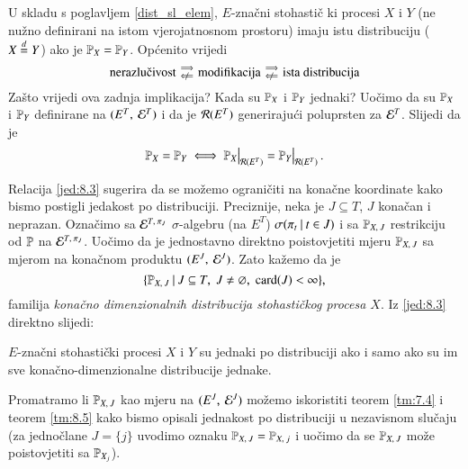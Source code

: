 U skladu s poglavljem \ref{dist_sl_elem}, $E$-zna\v cni stohasti\v c ki procesi $X$ i $Y$ (ne nu\v zno definirani na istom vjerojatnosnom prostoru) imaju istu distribuciju ($X \overset{d}{=} Y$) ako je $\mathbb{P}_X = \mathbb{P}_Y$.
Op\' cenito vrijedi
\begin{equation*}
    \textnormal{nerazlu\v civost}
    \begin{smallmatrix}
        \implies\\
        \notimpliedby
    \end{smallmatrix}
    \textnormal{modifikacija}
    \begin{smallmatrix}
        \implies\\
        \notimpliedby
    \end{smallmatrix}
    \textnormal{ista distribucija}
\end{equation*}
Za\v sto vrijedi ova zadnja implikacija?
Kada su $\mathbb{P}_X$ i $\mathbb{P}_Y$ jednaki?
Uo\v cimo da su $\mathbb{P}_X$ i $\mathbb{P}_Y$ definirane na $({E^T}, \: {\mathcal{E}^T})$ i da je $\mathcal{R}({E^T})$ generiraju\' ci poluprsten za $\mathcal{E}^T$.
Slijedi da je
\begin{equation}    \label{jed:8.3}
    \masP_X = \masP_Y
    \iff
    \restr{\masP_X}{\prsten{E^T}} = \restr{\masP_Y}{\prsten{E^T}}.
\end{equation}

Relacija \ref{jed:8.3} sugerira da se mo\v zemo ograni\v citi na kona\v cne koordinate kako bismo postigli jedakost po distribuciji.
Preciznije, neka je $J \subseteq T$, $J$ kona\v can i neprazan.
Ozna\v cimo sa $\mathcal{E}^{T, \: \pi_J}$ $\sigma$-algebru (na $E^T$) $\sigma({\pi_t} \: | \: {t \in J})$ i sa $\mathbb{P}_{X, \: J}$ restrikciju od $\mathbb{P}$ na $\mathcal{E}^{T, \: \pi_J}$.
Uo\v cimo da je jednostavno direktno poistovjetiti mjeru $\mathbb{P}_{X, \: J}$ sa mjerom na kona\v cnom produktu $({E^J}, \: {\mathcal{E}^J})$.
Zato ka\v zemo da je
\begin{equation}    \label{jed:8.4}
    \{{\mathbb{P}_{X, \: J}} \: | \: {J \subseteq T, \; J \neq \varnothing, \; \textnormal{card}({J}) < \infty}\},
\end{equation}
familija \emph{kona\v cno dimenzionalnih distribucija stohasti\v ckog procesa $X$}.
Iz \eqref{jed:8.3} direktno slijedi:

\begin{tm}  \label{tm:8.5}
    $E$-zna\v cni stohasti\v cki procesi $X$ i $Y$ su jednaki po distribuciji ako i samo ako su im sve kona\v cno-dimenzionalne distribucije jednake.
\end{tm}

Promatramo li $\mathbb{P}_{X, \: J}$ kao mjeru na $({E^J}, \: {\mathcal{E}^J})$ mo\v zemo iskoristiti teorem \ref{tm:7.4} i teorem \ref{tm:8.5} kako bismo opisali jednakost po distribuciji u nezavisnom slu\v caju (za jedno\v clane $J = \{j\}$ uvodimo oznaku $\mathbb{P}_{X, \: J} = \mathbb{P}_{X, \: j}$ i uo\v cimo da se $\mathbb{P}_{X, \: J}$ mo\v ze poistovjetiti sa $\mathbb{P}_{X_j}$).

